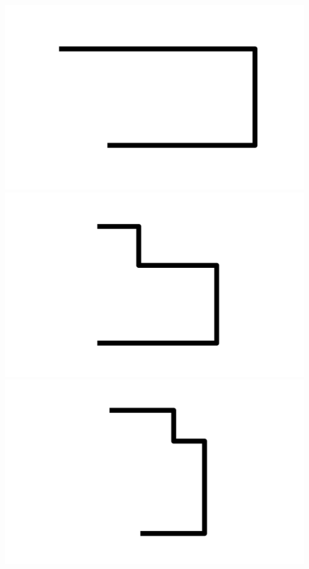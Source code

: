 \documentclass[]{report}
\begin{document}
\includegraphics[scale=.1]{pictures/18/state_cluster_shapes_7.pdf} 
\includegraphics[scale=.1]{pictures/18/state_cluster_shapes_8.pdf} 
\includegraphics[scale=.1]{pictures/18/state_cluster_shapes_9.pdf} 
\end{document}
